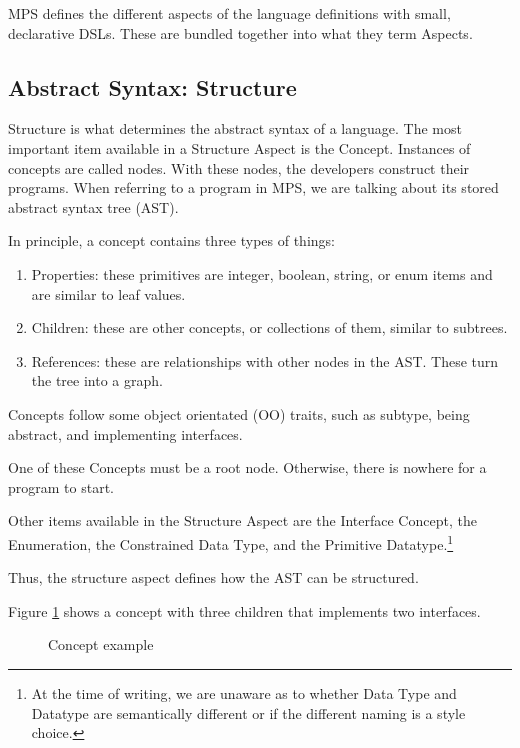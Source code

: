 MPS defines the different aspects of the language definitions with small, declarative DSLs.
These are bundled together into what they term Aspects.

\subsection{Abstract Syntax: Structure}
Structure is what determines the abstract syntax of a language.
The most important item available in a Structure Aspect is the Concept.
Instances of concepts are called nodes.
With these nodes, the developers construct their programs.
When referring to a program in MPS, we are talking about its stored abstract syntax tree (AST).

In principle, a concept contains three types of things:
\begin{enumerate}
    \setlength\itemsep{0em}
    \item Properties: these primitives are integer, boolean, string, or enum items and are similar to leaf values.
    \item Children: these are other concepts, or collections of them, similar to subtrees.
    \item References: these are relationships with other nodes in the AST. These turn the tree into a graph.
\end{enumerate}

Concepts follow some object orientated (OO) traits, such as subtype, being abstract, and implementing interfaces.

One of these Concepts must be a root node. 
Otherwise, there is nowhere for a program to start.

Other items available in the Structure Aspect are the Interface Concept, the Enumeration, the Constrained Data Type, and the Primitive Datatype.\footnote{At the time of writing, we are unaware as to whether Data Type and Datatype are semantically different or if the different naming is a style choice.}

Thus, the structure aspect defines how the AST can be structured.

Figure \ref{fig:concept_example} shows a concept with three children that implements two interfaces.

\begin{figure}[h]
    \centering
    \caption{Concept example}
    \label{fig:concept_example}
\end{figure}
 

